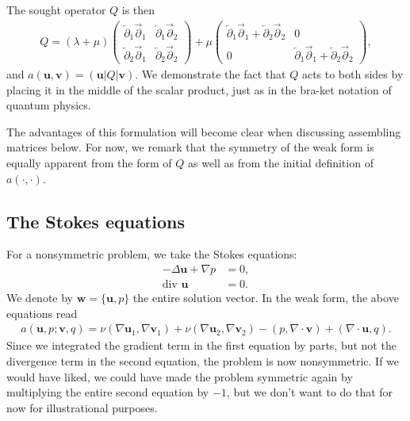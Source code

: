 \documentclass{article}
\newcommand{\leftpartial}{\overleftarrow \partial}
\newcommand{\rightpartial}{\overrightarrow \partial}
\renewcommand{\vec}[1]{{\mathbf #1}}
\begin{document}
The sought operator $Q$ is then
\begin{gather*}
  Q
  =
  (\lambda+\mu)
  \begin{pmatrix}
    \leftpartial_1 \rightpartial_1 &
    \leftpartial_1 \rightpartial_2 \\
    \leftpartial_2 \rightpartial_1 &
    \leftpartial_2 \rightpartial_2
  \end{pmatrix}
  +
  \mu
  \begin{pmatrix}
    \leftpartial_1 \rightpartial_1 + 
    \leftpartial_2 \rightpartial_2 & 0 \\
    0 & \leftpartial_1 \rightpartial_1 + 
    \leftpartial_2 \rightpartial_2
  \end{pmatrix},
\end{gather*}
and $a(\vec u,\vec v)=(\vec u | Q | \vec v)$. We demonstrate the fact that $Q$
acts to both sides by placing it in the middle of the scalar product, just as
in the bra-ket notation of quantum physics. 

The advantages of this formulation will become clear when discussing
assembling matrices below. For now, we remark that the symmetry of the weak
form is equally apparent from the form of $Q$ as well as from the initial
definition of $a(\cdot,\cdot)$.



\subsection{The Stokes equations}
\label{sec:stokes}

For a nonsymmetric problem, we take the Stokes equations: 
\begin{align*}
  -\Delta \vec u + \nabla p &= 0,
  \\
  \text{div } \vec u &= 0.
\end{align*}
We denote by $\vec w=\{\vec u,p\}$ the entire solution vector. In the weak
form, the above equations read
\begin{gather*}
  a(\vec u,p; \vec v, q)
  =
  \nu(\nabla \vec u_1, \nabla \vec v_1)
  +\nu(\nabla \vec u_2, \nabla \vec v_2)
  - (p, \nabla\cdot \vec v)
  + (\nabla\cdot\vec u, q).
\end{gather*}
Since we integrated the gradient term in the first equation by parts, but not
the divergence term in the second equation, the problem is now
nonsymmetric. If we would have liked, we could have made the problem symmetric
again by multiplying the entire second equation by $-1$, but we don't want to
do that for now for illustrational purposes.
\end{document}
